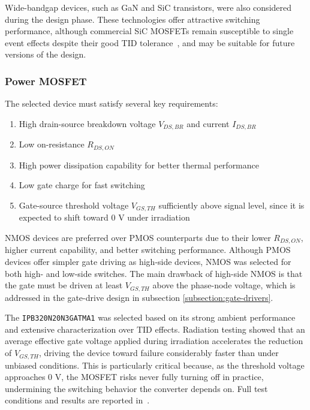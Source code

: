 Wide-bandgap devices, such as GaN and SiC transistors, were also considered during the design phase. These technologies offer attractive switching performance, although commercial SiC MOSFETs remain susceptible to single event effects despite their good TID tolerance~\cite{martinella_sic_mosfet}, and may be suitable for future versions of the design.

\subsubsection{Power MOSFET}
\label{subsubsection:power-mosfet}

The selected device must satisfy several key requirements:

\begin{enumerate}
    \item High drain-source breakdown voltage $V_{DS,BR}$ and current $I_{DS,BR}$
    \item Low on-resistance $R_{DS,ON}$
    \item High power dissipation capability for better thermal performance
    \item Low gate charge for fast switching
    \item Gate-source threshold voltage $V_{GS,TH}$ sufficiently above signal level, since it is expected to shift toward 0 V under irradiation
\end{enumerate}

NMOS devices are preferred over PMOS counterparts due to their lower $R_{DS,ON}$, higher current capability, and better switching performance. Although PMOS devices offer simpler gate driving as high-side devices, NMOS was selected for both high- and low-side switches. The main drawback of high-side NMOS is that the gate must be driven at least $V_{GS,TH}$ above the phase-node voltage, which is addressed in the gate-drive design in subsection \ref{subsection:gate-drivers}.

The \texttt{IPB320N20N3GATMA1} was selected based on its strong ambient performance and extensive characterization over TID effects. Radiation testing showed that an average effective gate voltage applied during irradiation accelerates the reduction of $V_{GS,TH}$, driving the device toward failure considerably faster than under unbiased conditions. This is particularly critical because, as the threshold voltage approaches 0 V, the MOSFET risks never fully turning off in practice, undermining the switching behavior the converter depends on. Full test conditions and results are reported in~\cite{mosfet_edms}.

